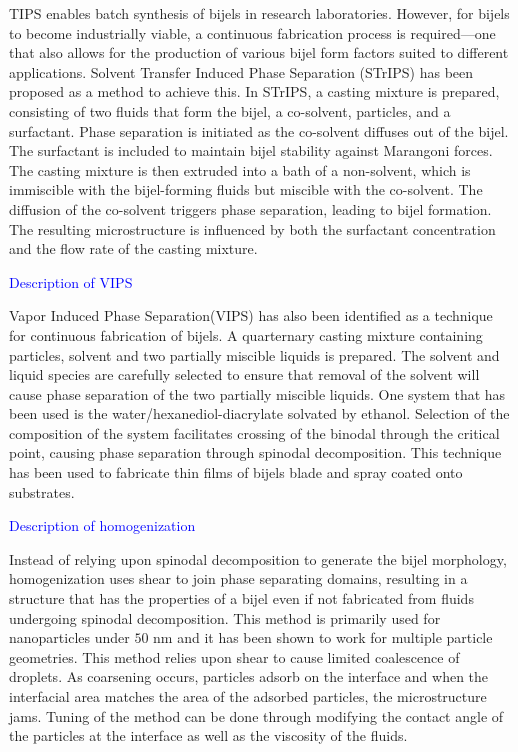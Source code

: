 TIPS enables batch synthesis of bijels in research laboratories. However, for bijels to become industrially viable, a continuous fabrication process is required—one 
that also allows for the production of various bijel form factors suited to different applications. Solvent Transfer Induced Phase Separation (STrIPS) has been proposed 
as a method to achieve this. In STrIPS, a casting mixture is prepared, consisting of two fluids that form the bijel, a co-solvent, particles, and a surfactant. Phase 
separation is initiated as the co-solvent diffuses out of the bijel. The surfactant is included to maintain bijel stability against Marangoni forces. The casting mixture 
is then extruded into a bath of a non-solvent, which is immiscible with the bijel-forming fluids but miscible with the co-solvent. The diffusion of the co-solvent triggers 
phase separation, leading to bijel formation. The resulting microstructure is influenced by both the surfactant concentration and the flow rate of the casting mixture.

\textcolor{blue}{Description of VIPS}

Vapor Induced Phase Separation(VIPS) has also been identified as a technique for continuous fabrication of bijels. \cite{wang_scalable_2020} A quarternary casting mixture
containing particles, solvent and two partially miscible liquids is prepared. The solvent and liquid species are carefully selected to ensure that removal of the
solvent will cause phase separation of the two partially miscible liquids. One system that has been used is the water/hexanediol-diacrylate solvated by ethanol.
Selection of the composition of the system facilitates crossing of the binodal through the critical point, causing phase separation through spinodal decomposition.
This technique has been used to fabricate thin films of bijels blade and spray coated onto substrates.

\textcolor{blue}{Description of homogenization}

Instead of relying upon spinodal decomposition to generate the bijel morphology, homogenization uses shear to join phase separating domains, resulting in a 
structure that has the properties of a bijel even if not fabricated from fluids undergoing spinodal decomposition. \cite{huang_bicontinuous_2017, cai_bijels_2017} 
This method is primarily used for nanoparticles under $50$ nm and it has been shown to work for multiple particle geometries. This method relies upon
shear to cause limited coalescence of droplets. As coarsening occurs, particles adsorb on the interface and when the interfacial area matches the area of the
adsorbed particles, the microstructure jams. Tuning of the method can be done through modifying the contact angle of the particles at the interface as well as
the viscosity of the fluids. 

